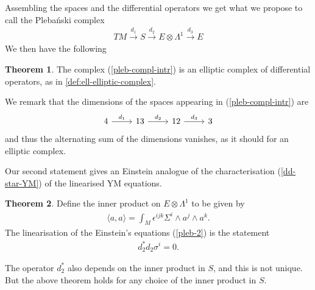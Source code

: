 \documentclass[10pt]{report}
\newcommand{\pleb}[0]{Pleba\'nski}
\theoremstyle{definition}
\newtheorem{theorem}{Theorem}[chapter]
\begin{document}
Assembling the spaces and the differential operators we get what we propose to call the \pleb{} complex
\begin{align} \label{pleb-compl-intr}
    TM \overset{d_1}{\longrightarrow} S \overset{d_2}{\longrightarrow} E \otimes \Lambda^1 \overset{d_3}{\longrightarrow} E    
\end{align}
We then have the following
\begin{theorem}\label{thrm:pleb-complex-is-elliptic}
    The complex (\ref{pleb-compl-intr}) is an elliptic complex of differential operators, as in \cref{def:ell-elliptic-complex}.
\end{theorem}
We remark that the dimensions of the spaces appearing in (\ref{pleb-compl-intr}) are
\begin{equation}
\begin{tikzcd}\label{pleb-compl-intr-dims}
    4  \arrow{r}{d_1} & 13  \arrow{r}{d_2} & 12  \arrow{r}{d_3} & 3
\end{tikzcd}
\end{equation}
and thus the alternating sum of the dimensions vanishes, as it should for an elliptic complex. 

Our second statement gives an Einstein analogue of the characterisation (\ref{dd-star-YM}) of the linearised YM equations.
\begin{theorem}\label{thrm:pleb-complex-adjoint-gives-einsteins-equations} Define the inner product on $E\otimes \Lambda^1$ to be given by
\begin{align}\label{inner-prod-a}
\langle a,a\rangle = \int_M \epsilon^{ijk} \Sigma^i \wedge a^j \wedge a^k.
\end{align}
The linearisation of the Einstein's equations (\ref{pleb-2}) is the statement 
\begin{align}
d_2^* d_2 \sigma^i =0.
\end{align}
\end{theorem}
The operator $d_2^*$ also depends on the inner product in $S$, and this is not unique. But the above theorem holds for any choice of the inner product in $S$. 
\end{document}
